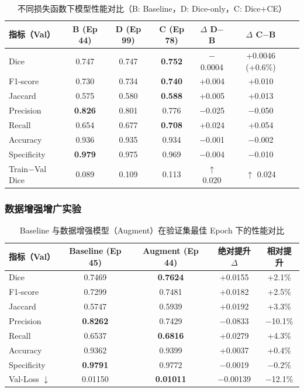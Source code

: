 \begin{table}[htbp]
    \centering
    \caption{不同损失函数下模型性能对比（B: Baseline，D: Dice-only，C: Dice+CE）}
    \label{tab:loss_ablation}
    \begin{tabular}{lcccccc}
        \toprule
        指标（Val） & B (Ep 44) & D (Ep 99) & C (Ep 78) & $\Delta$ D$-$B & $\Delta$ C$-$B \\
        \midrule
        Dice        & 0.747 & 0.747 & \textbf{0.752} & $-$0.0004 & +0.0046 (+0.6\%) \\
        F1-score    & 0.730 & 0.734 & \textbf{0.740} & +0.004 & +0.010 \\
        Jaccard     & 0.575 & 0.580 & \textbf{0.588} & +0.005 & +0.013 \\
        Precision   & \textbf{0.826} & 0.801 & 0.776 & $-$0.025 & $-$0.050 \\
        Recall      & 0.654 & 0.677 & \textbf{0.708} & +0.024 & +0.054 \\
        Accuracy    & 0.936 & 0.935 & 0.934 & $-$0.001 & $-$0.002 \\
        Specificity & \textbf{0.979} & 0.975 & 0.969 & $-$0.004 & $-$0.010 \\
        Train$-$Val Dice & 0.089 & 0.109 & 0.113 & $\uparrow$ 0.020 & $\uparrow$ 0.024 \\
        \bottomrule
    \end{tabular}
\end{table}

\subsubsection{数据增强增广实验}

\begin{table}[htbp]
    \centering
    \caption{Baseline 与数据增强模型（Augment）在验证集最佳 Epoch 下的性能对比}
    \label{tab:augment_best}
    \begin{tabular}{lcccc}
        \toprule
        指标（Val） & Baseline (Ep 45) & Augment (Ep 44) & 绝对提升 $\Delta$ & 相对提升 \\
        \midrule
        Dice        & 0.7469 & \textbf{0.7624} & +0.0155 & +2.1\% \\
        F1-score    & 0.7299 & 0.7481 & +0.0182 & +2.5\% \\
        Jaccard     & 0.5747 & 0.5939 & +0.0192 & +3.3\% \\
        Precision   & \textbf{0.8262} & 0.7429 & $-$0.0833 & $-$10.1\% \\
        Recall      & 0.6537 & \textbf{0.6816} & +0.0279 & +4.3\% \\
        Accuracy    & 0.9362 & 0.9399 & +0.0037 & +0.4\% \\
        Specificity & \textbf{0.9791} & 0.9772 & $-$0.0019 & $-$0.2\% \\
        Val-Loss $\downarrow$ & 0.01150 & \textbf{0.01011} & $-$0.00139 & $-$12.1\% \\
        \bottomrule
    \end{tabular}
\end{table}

